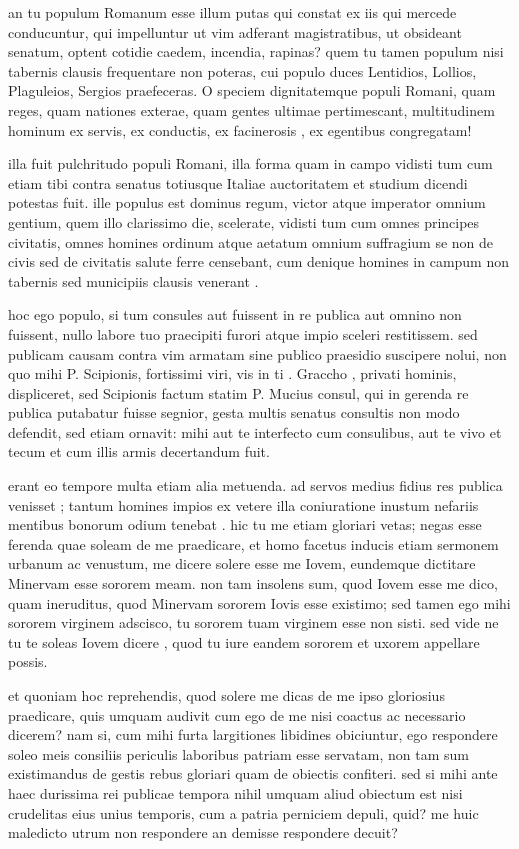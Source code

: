  an tu populum Romanum esse illum putas qui constat ex iis qui mercede conducuntur, qui impelluntur ut vim adferant magistratibus, ut obsideant senatum, optent cotidie caedem, incendia, rapinas? quem tu tamen populum nisi tabernis clausis frequentare non poteras, cui populo duces Lentidios, Lollios, Plaguleios, Sergios praefeceras. O speciem dignitatemque populi Romani, quam reges, quam nationes exterae, quam gentes ultimae pertimescant, multitudinem hominum ex servis, ex conductis, ex facinerosis , ex egentibus congregatam!

 illa fuit pulchritudo populi Romani, illa forma quam in campo vidisti tum cum etiam tibi contra senatus totiusque Italiae auctoritatem et studium dicendi potestas fuit. ille populus est dominus regum, victor atque imperator omnium gentium, quem illo clarissimo die, scelerate, vidisti tum cum omnes principes civitatis, omnes homines ordinum atque aetatum omnium suffragium se non de civis sed de civitatis salute ferre censebant, cum denique homines in campum non tabernis sed municipiis clausis venerant .

 hoc ego populo, si tum consules aut fuissent in re publica aut omnino non fuissent, nullo labore tuo praecipiti furori atque impio sceleri restitissem. sed publicam causam contra vim armatam sine publico praesidio suscipere nolui, non quo mihi P. Scipionis, fortissimi viri, vis in ti . Graccho , privati hominis, displiceret, sed Scipionis factum statim P. Mucius consul, qui in gerenda re publica putabatur fuisse segnior, gesta multis senatus consultis non modo defendit, sed etiam ornavit: mihi aut te interfecto cum consulibus, aut te vivo et tecum et cum illis armis decertandum fuit.

 erant eo tempore multa etiam alia metuenda. ad servos medius fidius res publica venisset ; tantum homines impios ex vetere illa coniuratione inustum nefariis mentibus bonorum odium tenebat . hic tu me etiam gloriari vetas; negas esse ferenda quae soleam de me praedicare, et homo facetus inducis etiam sermonem urbanum ac venustum, me dicere solere esse me Iovem, eundemque dictitare Minervam esse sororem meam. non tam insolens sum, quod Iovem esse me dico, quam ineruditus, quod Minervam sororem Iovis esse existimo; sed tamen ego mihi sororem virginem adscisco, tu sororem tuam virginem esse non sisti. sed vide ne tu te soleas Iovem dicere , quod tu iure eandem sororem et uxorem appellare possis.

 et quoniam hoc reprehendis, quod solere me dicas de me ipso gloriosius praedicare, quis umquam audivit cum ego de me nisi coactus ac necessario dicerem? nam si, cum mihi furta largitiones libidines obiciuntur, ego respondere soleo meis consiliis periculis laboribus patriam esse servatam, non tam sum existimandus de gestis rebus gloriari quam de obiectis confiteri. sed si mihi ante haec durissima rei publicae tempora nihil umquam aliud obiectum est nisi crudelitas eius unius temporis, cum a patria perniciem depuli, quid? me huic maledicto utrum non respondere an demisse respondere decuit?

